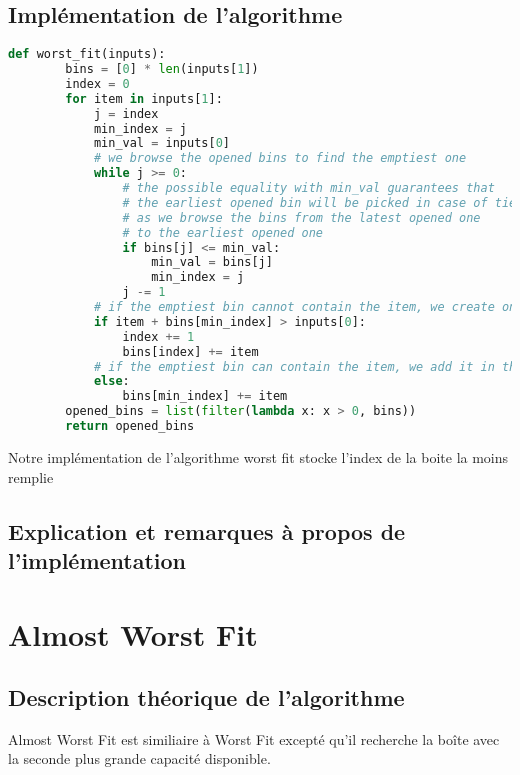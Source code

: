 \documentclass{article}
\begin{document}
    \subsection{Implémentation de l'algorithme}
    \begin{lstlisting}[language=Python, frame=single]
    def worst_fit(inputs):
        bins = [0] * len(inputs[1])
        index = 0
        for item in inputs[1]:
            j = index
            min_index = j
            min_val = inputs[0]
            # we browse the opened bins to find the emptiest one
            while j >= 0:
                # the possible equality with min_val guarantees that
                # the earliest opened bin will be picked in case of tie,
                # as we browse the bins from the latest opened one
                # to the earliest opened one
                if bins[j] <= min_val:
                    min_val = bins[j]
                    min_index = j
                j -= 1
            # if the emptiest bin cannot contain the item, we create one
            if item + bins[min_index] > inputs[0]:
                index += 1
                bins[index] += item
            # if the emptiest bin can contain the item, we add it in the bin
            else:
                bins[min_index] += item
        opened_bins = list(filter(lambda x: x > 0, bins))
        return opened_bins
    \end{lstlisting}
    Notre implémentation de l'algorithme worst fit stocke l'index de la boite la moins remplie

    \subsection{Explication et remarques à propos de l'implémentation}




    \section{Almost Worst Fit}

    \subsection{Description théorique de l'algorithme}
    Almost Worst Fit est similiaire à Worst Fit excepté qu'il recherche la boîte avec la seconde plus grande capacité disponible.
\end{document}
